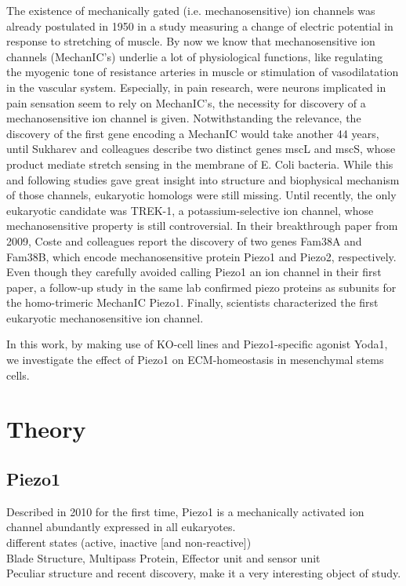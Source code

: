 The existence of mechanically gated (i.e. mechanosensitive) ion channels was already postulated in 1950 in a study measuring a change of electric potential in response to stretching of muscle. By now we know that mechanosensitive ion channels (MechanIC’s) underlie a lot of physiological functions, like regulating the myogenic tone of resistance arteries in muscle or stimulation of vasodilatation in the vascular system. Especially, in pain research, were neurons implicated in pain sensation seem to rely on MechanIC’s, the necessity for discovery of a mechanosensitive ion channel is given. Notwithstanding the relevance, the discovery of the first gene encoding a MechanIC would take another 44 years, until Sukharev and colleagues describe two distinct genes mscL and mscS, whose product mediate stretch sensing in the membrane of E. Coli bacteria. While this and following studies gave great insight into structure and biophysical mechanism of those channels, eukaryotic homologs were still missing. Until recently, the only eukaryotic candidate was TREK-1, a potassium-selective ion channel, whose mechanosensitive property is still controversial. In their breakthrough paper from 2009, Coste and colleagues report the discovery of two genes Fam38A and Fam38B, which encode mechanosensitive protein Piezo1 and Piezo2, respectively. Even though they carefully avoided calling Piezo1 an ion channel in their first paper, a follow-up study in the same lab confirmed piezo proteins as subunits for the homo-trimeric MechanIC Piezo1. Finally, scientists characterized the first eukaryotic mechanosensitive ion channel. 

In this work, by making use of KO-cell lines and Piezo1-specific agonist Yoda1, we investigate the effect of Piezo1 on ECM-homeostasis in mesenchymal stems cells. 




\section{Theory}

\subsection{Piezo1}
Described in 2010 for the first time, Piezo1 is a  mechanically activated ion channel abundantly expressed in all eukaryotes.\cite{Coste55} \\
different states (active, inactive [and non-reactive])\\
Blade Structure, Multipass Protein, Effector unit and sensor unit\\
Peculiar structure and recent discovery, make it a very interesting object of study. 

